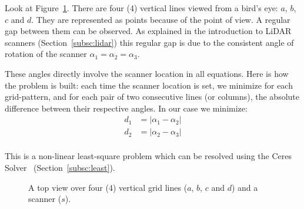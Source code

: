 Look at Figure~\ref{fig:topview}. There are four (4) vertical lines viewed from a bird's eye: $a$, $b$, $c$ and $d$. They are represented as points because of the point of view. A regular gap between them can be observed. As explained in the introduction to LiDAR scanners (Section~\ref{subsc:lidar}) this regular gap is due to the consistent angle of rotation of the scanner $\alpha_1 = \alpha_2 = \alpha_3$.

These angles directly involve the scanner location in all equations. Here is how the problem is built: each time the scanner location is set, we minimize for each grid-pattern, and for each pair of two consecutive lines (or columns), the absolute difference between their respective angles. In our case we minimize:
\begin{align*}
  d_1 &= |\alpha_1 - \alpha_2|\\
  d_2 &= |\alpha_2 - \alpha_3|\\
\end{align*}

This is a non-linear least-square problem which can be resolved using the Ceres Solver~\cite{ceres} (Section~\ref{subsc:least}).

\begin{figure}
  \centering
  \caption{A top view over four (4) vertical grid lines ($a$, $b$, $c$ and $d$) and a scanner ($s$).}
  \label{fig:topview}
\end{figure}

